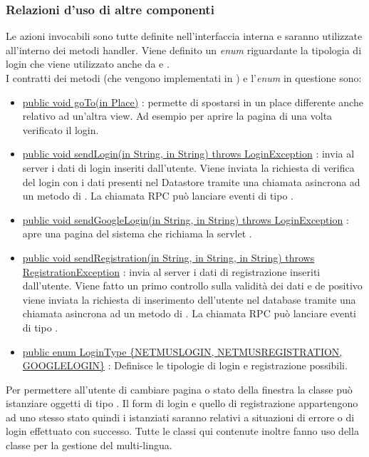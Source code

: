 \subsubsection*{Relazioni d'uso di altre componenti} Le azioni invocabili
sono tutte definite nell'interfaccia interna
 e saranno utilizzate all'interno dei metodi handler. Viene
definito un \emph{enum} riguardante la tipologia di login che viene utilizzato
anche da  e . \\ I contratti dei metodi (che vengono
implementati in ) e l'\emph{enum} in questione sono:
\begin{itemize}
  \item \underline{public void goTo(in Place)} : permette di spostarsi in un
  place differente anche relativo ad un'altra view. Ad esempio per aprire la pagina di
   una volta verificato il login.
  \item \underline{public void sendLogin(in String, in String) throws  LoginException}
  : invia al server i dati di login inseriti
  dall'utente. Viene inviata la richiesta di verifica del login con i dati
  presenti nel Datastore tramite una chiamata asincrona ad un metodo di
  . La chiamata RPC pu\`o lanciare eventi di tipo
  .
  \item \underline{public void sendGoogleLogin(in String, in String)
  throws LoginException} : apre una pagina del sistema che richiama la servlet
  .
  \item \underline{public void sendRegistration(in String, in String, in String)
  throws RegistrationException} : invia al server i dati di registrazione inseriti
  dall'utente. Viene fatto un primo controllo sulla validit\`a dei dati e de
  positivo viene inviata la richiesta di inserimento dell'utente nel database
  tramite una chiamata asincrona ad un metodo di . La chiamata
  RPC pu\`o lanciare eventi di tipo .
  \item \underline{public enum LoginType \{NETMUSLOGIN, NETMUSREGISTRATION,
  GOOGLELOGIN\}} : Definisce le tipologie di login e registrazione possibili.
\end{itemize}
Per permettere all'utente di cambiare pagina o stato della finestra la classe
pu\`o istanziare oggetti di tipo . Il form di login e quello di
registrazione appartengono ad uno stesso stato quindi i 
istanziati saranno relativi a situazioni di errore o di login effettuato con successo. 
Tutte le classi qui contenute inoltre fanno uso della classe 
per la gestione del multi-lingua. 
